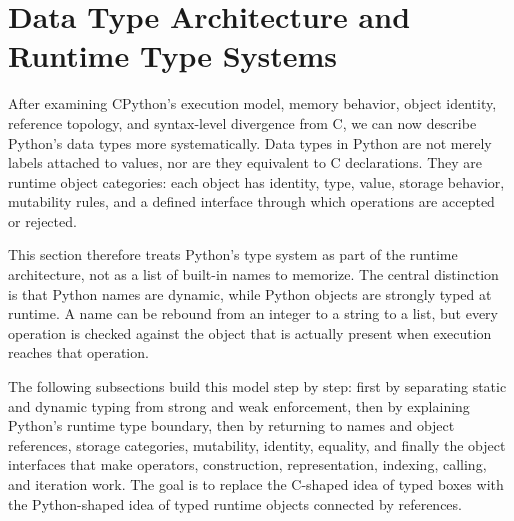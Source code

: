 \section{Data Type Architecture and Runtime Type Systems}

After examining CPython's execution model, memory behavior, object identity, reference topology, and syntax-level divergence from C, we can now describe Python's data types more systematically. Data types in Python are not merely labels attached to values, nor are they equivalent to C declarations. They are runtime object categories: each object has identity, type, value, storage behavior, mutability rules, and a defined interface through which operations are accepted or rejected.

This section therefore treats Python's type system as part of the runtime architecture, not as a list of built-in names to memorize. The central distinction is that Python names are dynamic, while Python objects are strongly typed at runtime. A name can be rebound from an integer to a string to a list, but every operation is checked against the object that is actually present when execution reaches that operation.

The following subsections build this model step by step: first by separating static and dynamic typing from strong and weak enforcement, then by explaining Python's runtime type boundary, then by returning to names and object references, storage categories, mutability, identity, equality, and finally the object interfaces that make operators, construction, representation, indexing, calling, and iteration work. The goal is to replace the C-shaped idea of typed boxes with the Python-shaped idea of typed runtime objects connected by references.
